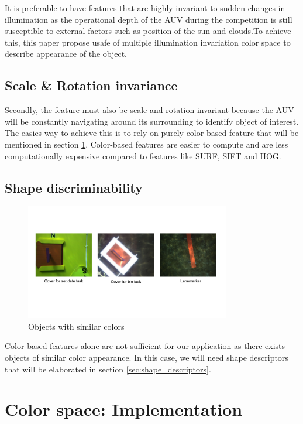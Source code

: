\documentclass[fypca]{socreport}
\begin{document}
It is preferable to have features that are highly invariant to sudden changes in
illumination as the operational depth of the AUV during the competition is still
susceptible to external factors such as position of the sun and clouds.To
achieve this, this paper propose usafe of multiple illumination invariation
color space to describe appearance of the object.

\subsection{Scale \& Rotation invariance}
Secondly, the feature must also be scale and rotation invariant because the AUV
will be constantly navigating around its surrounding to identify object of
interest. The easies way to achieve this is to rely on purely color-based
feature that will be mentioned in section \ref{sec:color_descriptors}. Color-based features are easier to
compute and are less computationally expensive compared to features like SURF,
SIFT and HOG.

\subsection{Shape discriminability}

\begin{figure}[H]
\centering
  \includegraphics[width=0.8\textwidth, height=0.3\textheight]{similarcolor.png}
  \caption{Objects with similar colors}
  \label{fig:similar_color}
\end{figure}

Color-based features alone are not sufficient for our application as there
exists objects of similar color appearance. In this case, we will need shape
descriptors that will be elaborated in section \ref{sec:shape_descriptors}.

\section{Color space: Implementation}
\label{sec:color_descriptors}
\end{document}
